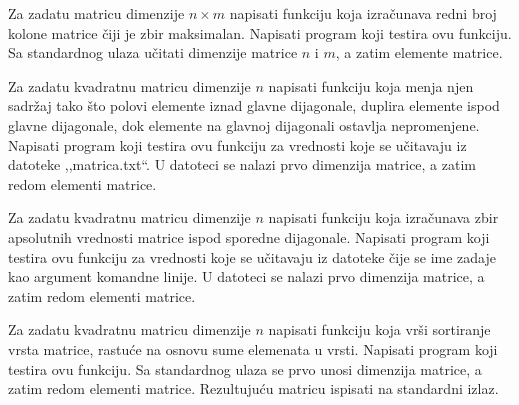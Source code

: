 \begin{Exercise}[label=336]
Za zadatu matricu dimenzije $n \times m$ napisati funkciju koja
izračunava redni broj kolone matrice čiji je zbir
maksimalan. Napisati program koji testira ovu funkciju. Sa
standardnog ulaza učitati dimenzije matrice $n$ i
$m$, a zatim elemente matrice. 

\end{Exercise}
\begin{Answer}[ref=336]
\end{Answer}

\begin{Exercise}[label=337]
Za zadatu kvadratnu matricu dimenzije $n$ napisati funkciju
koja menja njen sadržaj tako što polovi elemente iznad
glavne dijagonale, duplira elemente ispod glavne dijagonale, dok
elemente na glavnoj dijagonali ostavlja nepromenjene. Napisati
program koji testira ovu funkciju za vrednosti koje se
učitavaju iz datoteke ,,matrica.txt``. U datoteci se nalazi
prvo dimenzija matrice, a zatim redom elementi matrice.
\end{Exercise}
\begin{Answer}[ref=337]
\end{Answer}

\begin{Exercise}[label=338]
Za zadatu kvadratnu matricu dimenzije $n$ napisati funkciju
koja izračunava zbir apsolutnih vrednosti matrice ispod
sporedne dijagonale. Napisati program koji testira ovu funkciju za
vrednosti koje se učitavaju iz datoteke čije se ime zadaje
kao argument komandne linije. U datoteci se nalazi prvo dimenzija
matrice, a zatim redom elementi matrice.
\end{Exercise}
\begin{Answer}[ref=338]
\end{Answer}

\begin{Exercise}[label=339]
Za zadatu kvadratnu matricu dimenzije $n$ napisati funkciju
koja vrši sortiranje vrsta matrice, rastuće na osnovu sume
elemenata u vrsti. Napisati program koji testira ovu funkciju. Sa
standardnog ulaza se prvo unosi dimenzija matrice, a zatim redom
elementi matrice. Rezultujuću matricu ispisati na standardni
izlaz.
\end{Exercise}
\begin{Answer}[ref=339]
\end{Answer}

